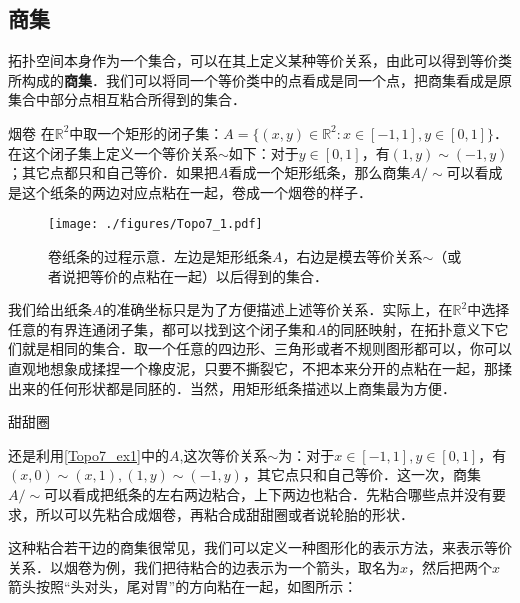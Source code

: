 
\subsection{商集}

拓扑空间本身作为一个集合，可以在其上定义某种等价关系，由此可以得到等价类所构成的\textbf{商集}．我们可以将同一个等价类中的点看成是同一个点，把商集看成是原集合中部分点相互粘合所得到的集合．

\begin{example}{烟卷}\label{Topo7_ex1}
在$\mathbb{R}^2$中取一个矩形的闭子集：$A=\{(x,y)\in\mathbb{R}^2:x\in[-1,1],y\in[0,1]\}$．在这个闭子集上定义一个等价关系$\sim$如下：对于$y\in[0,1]$，有$(1, y)\sim(-1, y)$；其它点都只和自己等价．如果把$A$看成一个矩形纸条，那么商集$A/\sim$可以看成是这个纸条的两边对应点粘在一起，卷成一个烟卷的样子．

\begin{figure}[ht]
\centering
\texttt{[image: ./figures/Topo7\_1.pdf]}
\caption{卷纸条的过程示意．左边是矩形纸条$A$，右边是模去等价关系$\sim$（或者说把等价的点粘在一起）以后得到的集合．} \label{Topo7_fig1}
\end{figure}

\end{example}



我们给出纸条$A$的准确坐标只是为了方便描述上述等价关系．实际上，在$\mathbb{R}^2$中选择任意的有界连通闭子集，都可以找到这个闭子集和$A$的同胚映射，在拓扑意义下它们就是相同的集合．取一个任意的四边形、三角形或者不规则图形都可以，你可以直观地想象成揉捏一个橡皮泥，只要不撕裂它，不把本来分开的点粘在一起，那揉出来的任何形状都是同胚的．当然，用矩形纸条描述以上商集最为方便．

\begin{example}{甜甜圈}

还是利用\autoref{Topo7_ex1}中的$A$,这次等价关系$\sim$为：对于$x\in[-1,1], y\in[0,1]$，有$(x,0)\sim(x,1), (1, y)\sim(-1, y)$，其它点只和自己等价．这一次，商集$A/\sim$可以看成把纸条的左右两边粘合，上下两边也粘合．先粘合哪些点并没有要求，所以可以先粘合成烟卷，再粘合成甜甜圈或者说轮胎的形状．

\end{example}

这种粘合若干边的商集很常见，我们可以定义一种图形化的表示方法，来表示等价关系．以烟卷为例，我们把待粘合的边表示为一个箭头，取名为$x$，然后把两个$x$箭头按照“头对头，尾对胃”的方向粘在一起，如图所示：

